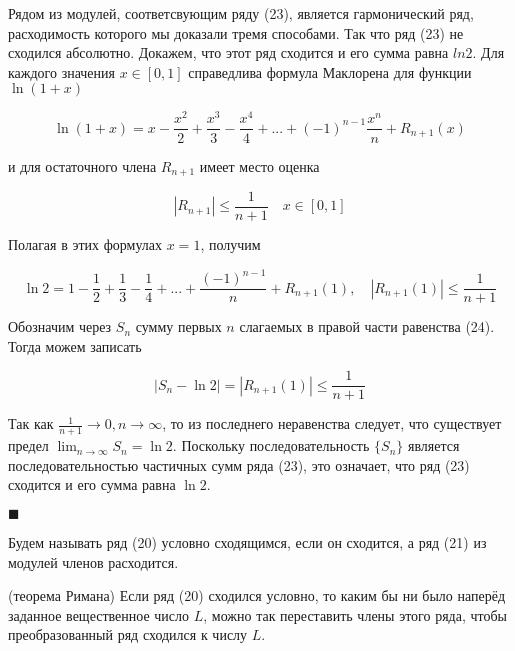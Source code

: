 Рядом из модулей, соответсвующим ряду (23), является гармонический ряд, расходимость которого мы доказали тремя способами. Так что ряд (23) не сходился абсолютно. Докажем, что этот ряд сходится и его сумма равна $ln 2$. Для каждого значения $x \in [0, 1]$ справедлива формула Маклорена для функции $\ln (1 +  x)$

\begin{equation*}
	\ln (1 + x) = x - \frac{x^2}{2} + \frac{x^3}{3} - \frac{x^4}{4} + ... + (-1)^{n - 1}\frac{x^n}{n} + R_{n + 1}(x)
\end{equation*}

и для остаточного члена $R_{n + 1}$ имеет место оценка 

\begin{equation*}
	|R_{n + 1}| \leqslant \frac{1}{n + 1}\quad x \in [0, 1]
\end{equation*}

Полагая в этих формулах $x = 1$, получим

\begin{equation}
	\ln 2 = 1 - \frac{1}{2} + \frac{1}{3} - \frac{1}{4} + ... + \frac{(-1)^{n - 1}}{n} + R_{n + 1}(1),\quad |R_{n + 1}(1)| \leqslant \frac{1}{n + 1}
\end{equation}

Обозначим через $S_n$ сумму первых $n$ слагаемых в правой части равенства (24). Тогда можем записать

\begin{equation*}
	|S_n - \ln 2| = |R_{n + 1}(1)| \leqslant \frac{1}{n + 1}
\end{equation*}

Так как {\small $\frac{1}{n + 1} \rightarrow 0, n\rightarrow \infty$}, то из последнего неравенства следует, что существует предел {\small $\displaystyle\lim_{n \rightarrow\infty} S_n = \ln 2$}. Поскольку последовательность $\{S_n\}$ является  последовательностью частичных сумм ряда (23), это означает, что ряд (23) сходится и его сумма равна $\ln 2$.

\begin{flushright}
	$\blacksquare$
\end{flushright}

\begin{definition}
	Будем называть ряд (20) условно сходящимся, если он  сходится, а ряд (21) из модулей членов расходится.
\end{definition}

\begin{theorem}
	(теорема Римана) Если ряд (20) сходился условно, то каким бы ни было наперёд заданное вещественное число $L$, можно так переставить члены этого ряда, чтобы преобразованный ряд сходился к числу $L$.
\end{theorem}


